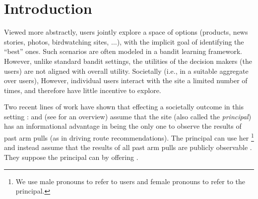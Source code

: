 \section{Introduction} \label{sec:introduction}


Viewed more abstractly, users jointly explore a space of
options (products, news stories, photos, birdwatching sites,
$\ldots$),
with the implicit goal of identifying the ``best'' ones.
Such scenarios are often modeled in a bandit
learning framework.
However, unlike standard bandit settings, the utilities of the
decision makers (the users) are not aligned with overall utility.
Societally (i.e., in a suitable aggregate over users),
However, individual users interact with the site a limited number
of times, and therefore have little incentive to explore.

Two recent lines of work have shown that
effecting a societally  outcome in this setting :
\citet{kremer2014implementing}
and
\citet{mansour2015bayesian,mansour2016bayesian,mansour2018competition}
(see \cite{slivkins:asymmetry} for an overview)
assume that the site (also called the \emph{principal}) has an
informational advantage in being the only one to observe the results
of past arm pulls
(as in driving route recommendations).
The principal can use her%
\footnote{We use male pronouns to refer to users and female pronouns
  to refer to the principal.}
\citet{frazier2014incentivizing} and 
\citet{han2015incentivizing} instead assume that the results of all
past arm pulls are publicly observable
.
They suppose the principal can  by offering .

